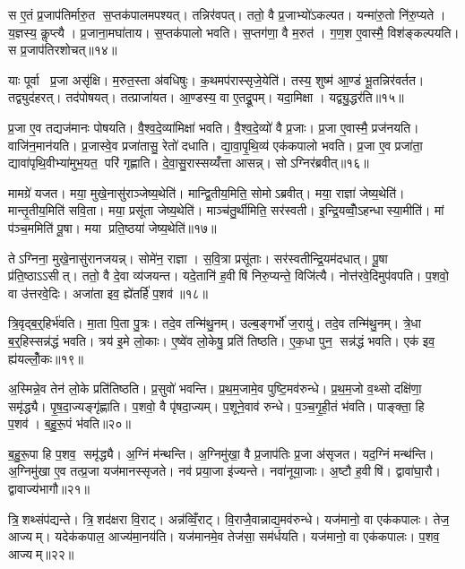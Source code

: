 स ए॒तं प्र॒जाप॑तिर्मारु॒त स॒प्तक॑पालमपश्यत्। तन्निर॑वपत्। ततो॒ वै प्र॒जाभ्यो॑ऽकल्पत। यन्मा॑रु॒तो नि॑रु॒प्यते। य॒ज्ञस्य॒ कॢप्त्यै। प्र॒जाना॒मघा॑ताय। स॒प्तक॑पालो भवति। स॒प्तग॑णा॒ वै म॒रुत॑। ग॒ण॒श ए॒वास्मै॒ विश॑ङ्कल्पयति। स प्र॒जाप॑तिरशोचत्॥१४॥

याः पूर्वा प्र॒जा असृ॑क्षि। म॒रुत॒स्ता अ॑वधिषुः। क॒थमप॑रास्सृजे॒येति॑। तस्य॒ शुष्म॑ आ॒ण्डं भू॒तन्निर॑वर्तत। तद्व्युद॑हरत्। तद॑पोषयत्। तत्प्राजा॑यत। आ॒ण्डस्य॒ वा ए॒तद्रू॒पम्। यदा॒मिक्षा। यद्व्यु॒द्धर॑ति॥१५॥

प्र॒जा ए॒व तद्यज॑मानः पोषयति। वै॒श्व॒दे॒व्या॑मिक्षा॑ भवति। वै॒श्व॒दे॒व्यो॑ वै प्र॒जाः। प्र॒जा ए॒वास्मै॒ प्रज॑नयति। वाजि॑न॒मान॑यति। प्र॒जास्वे॒व प्रजा॑तासु॒ रेतो॑ दधाति। द्या॒वा॒पृ॒थि॒व्य॑ एक॑कपालो भवति। प्र॒जा ए॒व प्रजा॑ता॒ द्यावा॑पृथि॒वीभ्या॑मुभ॒यत॒ परि॑ गृह्णाति। दे॒वा॒सु॒रास्सय्यँ॑त्ता आसन्न्। सोऽग्निर॑ब्रवीत्॥१६॥

मामग्रे॑ यजत। मया॒ मुखे॒नासु॑राञ्जेष्य॒थेति॑। मान्द्वि॒तीय॒मिति॒ सोमोऽब्रवीत्। मया॒ राज्ञा॑ जेष्य॒थेति॑। मान्तृ॒तीय॒मिति॑ सवि॒ता। मया॒ प्रसू॑ता जेष्य॒थेति॑। माञ्च॑तु॒र्थीमिति॒ सर॑स्वती। इ॒न्द्रि॒यव्वोँ॒ऽहन्धास्या॒मीति॑। मां प॑ञ्च॒ममिति॑ पू॒षा। मया प्रति॒ष्ठया॑ जेष्य॒थेति॑॥१७॥

तेऽग्निना॒ मुखे॒नासु॑रानजयन्न्। सोमे॑न॒ राज्ञा। स॒वि॒त्रा प्रसू॑ताः। सर॑स्वतीन्द्रि॒यम॑दधात्। पू॒षा प्र॑ति॒ष्ठाऽऽसीत्। ततो॒ वै दे॒वा व्य॑जयन्त। यदे॒तानि॑ ह॒वीषि॑ निरु॒प्यन्ते॒ विजि॑त्यै। नोत्त॑रवे॒दिमुप॑वपति। प॒शवो॒ वा उ॑त्तरवे॒दिः। अजा॑ता इव॒ ह्ये॑तर्\mbox{}हि॑ प॒शव॑॥१८॥\anuvakamend[ऐ॒दित्य॑शोचद्व्यु॒द्धर॑त्यब्रवीत्प्रति॒ष्ठया॑ जेष्य॒थेत्ये॒तर्\mbox{}हि॑ प॒शव॑]

त्रि॒वृद्ब॒र्॒हिर्भ॑वति। मा॒ता पि॒ता पु॒त्रः। तदे॒व तन्मि॑थु॒नम्। उल्ब॒ङ्गर्भो॑ ज॒रायु॑। तदे॒व तन्मि॑थु॒नम्। त्रे॒धा ब॒र्॒हिस्सन्न॑द्धं भवति। त्रय॑ इ॒मे लो॒काः। ए॒ष्वे॑व लो॒केषु॒ प्रति॑ तिष्ठति। ए॒क॒धा पुन॒ सन्न॑द्धं भवति। एक॑ इव॒ ह्य॑यल्लोँ॒कः॥१९॥

अ॒स्मिन्ने॒व तेन॑ लो॒के प्रति॑तिष्ठति। प्र॒सुवो॑ भवन्ति। प्र॒थ॒म॒जामे॒व पुष्टि॒मव॑रुन्धे। प्र॒थ॒म॒जो व॒थ्सो दक्षि॑णा॒ समृ॑द्ध्यै। पृ॒ष॒दा॒ज्यङ्गृ॑ह्णाति। प॒शवो॒ वै पृ॑षदा॒ज्यम्। प॒शूने॒वाव॑ रुन्धे। प॒ञ्च॒गृ॒ही॒तं भ॑वति। पाङ्क्ता॒ हि प॒शव॑। ब॒हु॒रू॒पं भ॑वति॥२०॥

ब॒हु॒रू॒पा हि प॒शव॒ समृ॑द्ध्यै। अ॒ग्निं म॑न्थन्ति। अ॒ग्निमु॑खा॒ वै प्र॒जाप॑तिः प्र॒जा अ॑सृजत। यद॒ग्निं मन्थ॑न्ति। अ॒ग्निमु॑खा ए॒व तत्प्र॒जा यज॑मानस्सृजते। नव॑ प्रया॒जा इ॑ज्यन्ते। नवा॑नूया॒जाः। अ॒ष्टौ ह॒वीषि॑। द्वावा॑घा॒रौ। द्वावाज्य॑भागौ॥२१॥

त्रि॒शथ्संप॑द्यन्ते। त्रि॒शद॑क्षरा वि॒राट्। अन्न॑व्विँ॒राट्। वि॒राजै॒वान्नाद्य॒मव॑रुन्धे। यज॑मानो॒ वा एक॑कपालः। तेज॒ आज्यम्। यदेक॑कपाल॒ आज्य॑मा॒नय॑ति। यज॑मानमे॒व तेज॑सा॒ सम॑र्धयति। यज॑मानो॒ वा एक॑कपालः। प॒शव॒ आज्यम्॥२२॥

